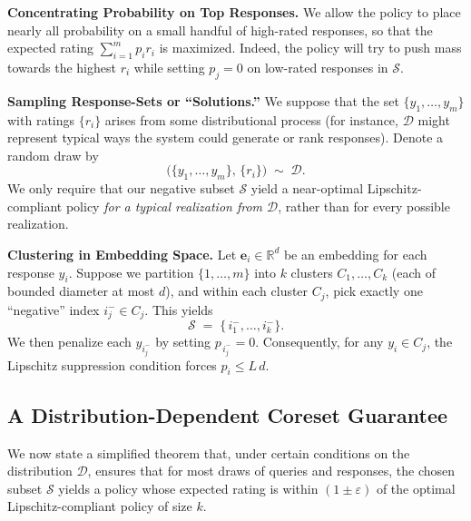 \vspace{0.5em}
\noindent
\textbf{Concentrating Probability on Top Responses.}  
We allow the policy to place nearly all probability on a small handful of high-rated responses, so that the expected rating \(\sum_{i=1}^m p_i r_i\) is maximized. Indeed, the policy will try to push mass towards the highest \(r_i\) while setting \(p_j=0\) on low-rated responses in \(\mathcal{S}\).

\noindent
\textbf{Sampling Response-Sets or ``Solutions.''}  
We suppose that the set \(\{y_1,\dots,y_m\}\) with ratings \(\{r_i\}\) arises from some distributional process (for instance, \(\mathcal{D}\) might represent typical ways the system could generate or rank responses). Denote a random draw by 
\[
  \bigl(\{y_1,\dots,y_m\},\,\{r_i\}\bigr)
  \;\sim\; 
  \mathcal{D}.
\]
We only require that our negative subset \(\mathcal{S}\) yield a near-optimal Lipschitz-compliant policy \emph{for a typical realization from \(\mathcal{D}\)}, rather than for every possible realization.

\vspace{0.5em}
\noindent
\textbf{Clustering in Embedding Space.}  
Let \(\mathbf{e}_i\in\mathbb{R}^d\) be an embedding for each response \(y_i\). Suppose we partition \(\{1,\dots,m\}\) into \(k\) clusters \(C_1,\dots,C_k\) (each of bounded diameter at most \(d\)), and within each cluster \(C_j\), pick exactly one ``negative'' index \(i_j^- \in C_j\). This yields 
\[
   \mathcal{S} 
   \;=\; 
   \{\, i_1^-, \dots, i_k^-\}.
\]
We then penalize each \(y_{i_j^-}\) by setting \(p_{\,i_j^-}=0\). Consequently, for any \(y_i \in C_j\), the Lipschitz suppression condition forces \(p_i \le L\,d\).  






\subsection{A Distribution-Dependent Coreset Guarantee}

We now state a simplified theorem that, under certain conditions on the distribution \(\mathcal{D}\), ensures that for most draws of queries and responses, the chosen subset \(\mathcal{S}\) yields a policy whose expected rating is within \((1\pm \varepsilon)\) of the optimal Lipschitz-compliant policy of size \(k\).

